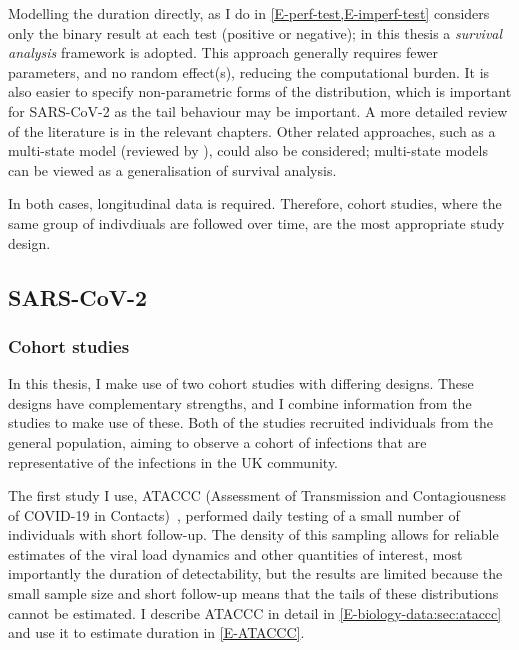 \documentclass[thesis.tex]{subfiles}
\begin{document}
Modelling the duration directly, as I do in \cref{E-perf-test,E-imperf-test} considers only the binary result at each test (positive or negative); in this thesis a \emph{survival analysis} framework is adopted.
This approach generally requires fewer parameters, and no random effect(s), reducing the computational burden.
It is also easier to specify non-parametric forms of the distribution, which is important for SARS-CoV-2 as the tail behaviour may be important.
A more detailed review of the literature is in the relevant chapters.
Other related approaches, such as a multi-state model (reviewed by \textcite{jacksonMSM}), could also be considered; multi-state models can be viewed as a generalisation of survival analysis.

In both cases, longitudinal data is required.
Therefore, cohort studies, where the same group of indivdiuals are followed over time, are the most appropriate study design.

\subsection{SARS-CoV-2} \label{intro:sec:duration-SARS-CoV-2}

\subsubsection{Cohort studies}

In this thesis, I make use of two cohort studies with differing designs.
These designs have complementary strengths, and I combine information from the studies to make use of these.
Both of the studies recruited individuals from the general population, aiming to observe a cohort of infections that are representative of the infections in the UK community.

The first study I use, ATACCC (Assessment of Transmission and Contagiousness of COVID-19 in Contacts)~\autocite{singanayagamCommunity,hakkiOnset}, performed daily testing of a small number of individuals with short follow-up.
The density of this sampling allows for reliable estimates of the viral load dynamics and other quantities of interest, most importantly the duration of detectability, but the results are limited because the small sample size and short follow-up means that the tails of these distributions cannot be estimated.
I describe ATACCC in detail in \cref{E-biology-data:sec:ataccc} and use it to estimate duration in \cref{E-ATACCC}.
\end{document}
